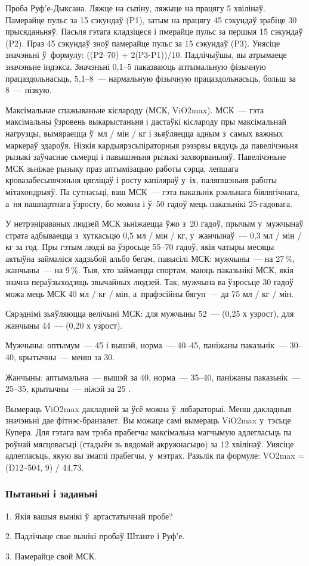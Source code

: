 Проба Руф'е-Дыксана. Ляжце на сьпіну, ляжыце на працягу 5 хвілінаў. Памерайце пульс за 15 сэкундаў (P1), затым на працягу 45 сэкундаў зрабіце 30 прысяданьняў. Пасьля гэтага кладзіцеся і пмерайце пульс за першыя 15 сэкундаў (P2). Праз 45 сэкундаў зноў памерайце пульс за 15 сэкундаў (P3). Унясіце значэньні ў~формулу: ((P2--70) + 2(P3-P1))/10. Падлічыўшы, вы атрымаеце значэньне індэкса. Значэньні 0,1--5 паказваюць аптымальную фізычную працаздольнасьць, 5,1--8~--- нармальную фізычную працаздольнасьць, больш за 8~--- нізкую.

Максімальнае спажываньне кіслароду (МСК, ViO2max). МСК~--- гэта максімальны ўзровень выкарыстаньня і дастаўкі кіслароду пры максімальнай нагрузцы, вымяраецца ў~мл / мін / кг і зьяўляецца адным з~самых важных маркераў здароўя. Нізкія кардыярэсьпіраторныя рэзэрвы вядуць да павелічэньня рызыкі заўчаснае сьмерці і павышэньня рызыкі захворваньняў. Павелічэньне МСК зьніжае рызыку праз аптымізацыю работы сэрца, лепшага кровазабесьпячэньня цягліцаў і росту капіляраў у~іх, паляпшэньня работы мітахондрыяў. Па сутнасьці, ваш МСК~--- гэта паказьнік рэальнага біялягічнага, а~ня пашпартнага ўзросту, бо можна і ў~50 гадоў мець паказьнікі 25-гадовага. 

У нетрэніраваных людзей МСК зьніжаецца ўжо з~20 гадоў, прычым у~мужчынаў страта адбываецца з~хуткасьцю 0,5 мл / мін / кг, у~жанчынаў~--- 0,3 мл / мін / кг за год. Пры гэтым людзі ва ўзросьце 55--70 гадоў, якія чатыры месяцы актыўна займаліся хадзьбой альбо бегам, павысілі МСК: мужчыны~--- на 27\,\%, жанчыны~--- на 9\,\%. Тыя, хто займаецца спортам, маюць паказьнікі МСК, якія значна пераўзыходзяць звычайных людзей. Так, мужчына ва ўзросьце 30 гадоў можа мець МСК 40 мл / кг / мін, а~прафэсійны бягун~--- да 75 мл / кг / мін.

Сярэднімі зьяўляюцца велічыні МСК: для мужчыны 52~--- (0,25 х узрост), для жанчыны 44~--- (0,20 х узрост). 

Мужчыны: оптымум~--- 45 і вышэй, норма~--- 40--45, паніжаны паказьнік~--- 30--40, крытычны~--- менш за 30. 

Жанчыны: аптымальна~--- вышэй за 40, норма~--- 35--40, паніжаны паказьнік~--- 25--35, крытычны~--- ніжэй за 25 .

Вымераць ViO2max дакладней за ўсё можна ў~лябараторыі. Менш дакладныя значэньні дае фітнэс-бранзалет. Вы можаце самі вымераць ViO2max у~тэсьце Купера. Для гэтага вам трэба прабегчы максімальна магчымую адлегласьць па роўнай мясцовасьці (стадыён зь вядомай акружнасьцю) за 12 хвілінаў. Унясіце адлегласьць, якую вы змаглі прабегчы, у~мэтрах. Разьлік па формуле: VO2max = (D12--504, 9) / 44,73.

\subsubsection{Пытаньні і заданьні}

1. Якія вашыя вынікі ў~артастатычнай пробе?

2. Падлічыце свае вынікі пробаў Штанге і Руф'е.

3. Памерайце свой МСК.

